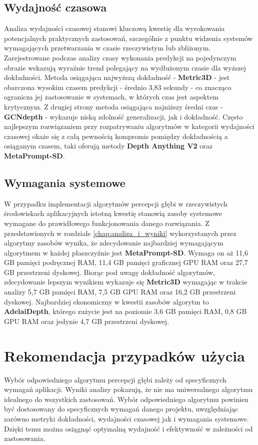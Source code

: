 \subsection{Wydajność czasowa}
Analiza wydajności czasowej stanowi kluczową kwestię dla wyrokowania potencjalnych praktycznych zastosowań, szczególnie z punktu widzenia systemów wymagających przetwarzania w czasie rzeczywistym lub zbliżonym. Zarejestrowane podczas analizy czasy wykonania predykcji na pojedynczym obrazie wskazują wyraźnie trend polegający na wydłużonym czasie dla wyższej dokładności. Metoda osiągająca najwyższą dokładność - \textbf{Metric3D} - jest obarczona wysokim czasem predykcji - średnio 3,83 sekundy - co znacząco ogranicza jej zastosowanie w systemach, w których czas jest aspektem krytycznym. Z drugiej strony metoda osiągająca najniższy średni czas - \textbf{GCNdepth} - wykazuje niską zdolność generalizacji, jak i dokładność. Często najlepszym rozwiązaniem przy rozpatrywaniu algorytmów w kategorii wydajności czasowej okaże się z całą pewnością kompromis pomiędzy dokładnością a osiąganym czasem, taki oferują metody \textbf{Depth Anything V2} oraz \textbf{MetaPrompt-SD}.

\subsection{Wymagania systemowe}
W przypadku implementacji algorytmów percepcji głębi w rzeczywistych środowiskach aplikacyjnych istotną kwestię stanowią zasoby systemowe wymagane do prawidłowego funkcjonowania danego rozwiązania. Z przedstawionych w rozdziale \ref{chap:analiza_i_wyniki} wykorzystanych przez algorytmy zasobów wynika, że zdecydowanie najbardziej wymagającym algorytmem w każdej płaszczyźnie jest \textbf{MetaPrompt-SD}. Wymaga on aż 11,6 GB pamięci podręcznej RAM, 11,4 GB pamięci graficznej GPU RAM oraz 27,7 GB przestrzeni dyskowej. Biorąc pod uwagę dokładność algorytmów, zdecydowanie lepszym wynikiem wykazuje się \textbf{Metric3D} wymagając w trakcie analizy 5,7 GB pamięci RAM, 7,5 GB GPU RAM oraz 16,2 GB przestrzeni dyskowej. Najbardziej ekonomiczny w kwestii zasobów algorytm to \textbf{AdelaiDepth}, którego zużycie jest na poziomie 3,6 GB pamięci RAM, 0,8 GB GPU RAM oraz jedynie 4,7 GB przestrzeni dyskowej.


\section{Rekomendacja przypadków użycia}
Wybór odpowiedniego algorytmu percepcji głębi zależy od specyficznych wymagań aplikacji. Wyniki analizy pokazują, że nie ma uniwersalnego algorytmu idealnego do wszystkich zastosowań. Wybór odpowiedniego algorytmu powinien być dostosowany do specyficznych wymagań danego projektu, uwzględniając zarówno metryki dokładności, wydajności czasowej jak i wymagania systemowe. Dzięki temu można osiągnąć optymalną wydajność i efektywność w zależności od zastosowania.

